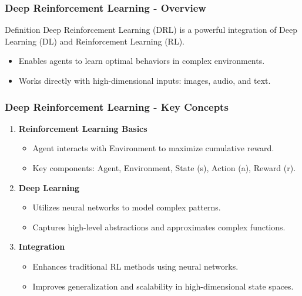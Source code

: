 \documentclass[aspectratio=169]{beamer}
\begin{document}
\begin{frame}[fragile]
    \frametitle{Deep Reinforcement Learning - Overview}
    \begin{block}{Definition}
        Deep Reinforcement Learning (DRL) is a powerful integration of Deep Learning (DL) and Reinforcement Learning (RL). 
    \end{block}
    \begin{itemize}
        \item Enables agents to learn optimal behaviors in complex environments.
        \item Works directly with high-dimensional inputs: images, audio, and text.
    \end{itemize}
\end{frame}

\begin{frame}[fragile]
    \frametitle{Deep Reinforcement Learning - Key Concepts}
    \begin{enumerate}
        \item \textbf{Reinforcement Learning Basics}
            \begin{itemize}
                \item Agent interacts with Environment to maximize cumulative reward.
                \item Key components: Agent, Environment, State (s), Action (a), Reward (r).
            \end{itemize}
        \item \textbf{Deep Learning}
            \begin{itemize}
                \item Utilizes neural networks to model complex patterns.
                \item Captures high-level abstractions and approximates complex functions.
            \end{itemize}
        \item \textbf{Integration}
            \begin{itemize}
                \item Enhances traditional RL methods using neural networks.
                \item Improves generalization and scalability in high-dimensional state spaces.
            \end{itemize}
    \end{enumerate}
\end{frame}
\end{document}
